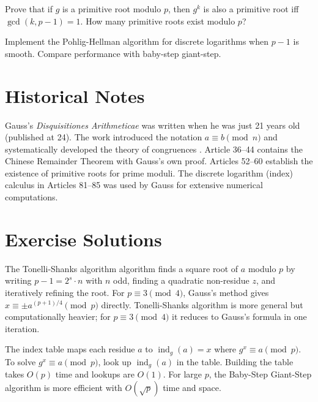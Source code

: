 \begin{exercise}
Prove that if $g$ is a primitive root modulo $p$, then $g^k$ is also a primitive root iff $\gcd(k, p-1) = 1$. How many primitive roots exist modulo $p$?
\end{exercise}

\begin{exercise}
Implement the Pohlig-Hellman algorithm for discrete logarithms when $p-1$ is smooth. Compare performance with baby-step giant-step.
\end{exercise}

\section{Historical Notes}

Gauss's \textit{Disquisitiones Arithmeticae} was written when he was just 21 years old (published at 24). The work introduced the notation $a \equiv b \pmod{n}$ and systematically developed the theory of congruences . Article 36--44 contains the Chinese Remainder Theorem with Gauss's own proof. Articles 52--60 establish the existence of primitive roots for prime moduli. The discrete logarithm (index) calculus in Articles 81--85 was used by Gauss for extensive numerical computations.



\section{Exercise Solutions}

\begin{solution}
The Tonelli-Shanks algorithm algorithm finds a square root of $a$ modulo $p$ by writing $p-1 = 2^s \cdot n$ with $n$ odd, finding a quadratic non-residue $z$, and iteratively refining the root. For $p \equiv 3 \pmod{4}$, Gauss's method gives $x \equiv \pm a^{(p+1)/4} \pmod{p}$ directly. Tonelli-Shanks algorithm is more general but computationally heavier; for $p \equiv 3 \pmod{4}$ it reduces to Gauss's formula in one iteration.
\end{solution}

\begin{solution}
The index table maps each residue $a$ to $\operatorname{ind}_g(a) = x$ where $g^x \equiv a \pmod{p}$. To solve $g^x \equiv a \pmod{p}$, look up $\operatorname{ind}_g(a)$ in the table. Building the table takes $O(p)$ time and lookups are $O(1)$. For large $p$, the Baby-Step Giant-Step algorithm is more efficient with $O(\sqrt{p})$ time and space.
\end{solution}

